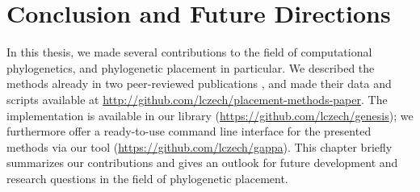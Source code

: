 
\chapter{Conclusion and Future Directions}
\label{ch:ConclusionFutureDirections}







In this thesis, we made several contributions to the field of computational phylogenetics,
and phylogenetic placement in particular.
We described the methods already in two peer-reviewed publications \cite{Czech2018,Czech2018a},
and made their data and scripts available at \url{http://github.com/lczech/placement-methods-paper}.
The implementation is available in our  library (\url{https://github.com/lczech/genesis});
we furthermore offer a ready-to-use command line interface for the presented methods
via our  tool (\url{https://github.com/lczech/gappa}).
This chapter briefly summarizes our contributions and gives an outlook for future development and research questions
in the field of phylogenetic placement.

